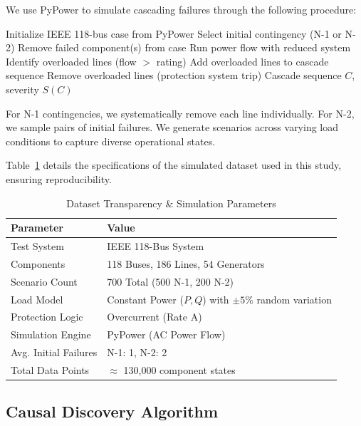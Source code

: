 \documentclass[journal,12pt,onecolumn]{IEEEtran}
\begin{document}
We use PyPower to simulate cascading failures through the following procedure:

\begin{algorithm}
\caption{Cascading Failure Simulation}
\begin{algorithmic}[1]
\STATE Initialize IEEE 118-bus case from PyPower
\STATE Select initial contingency (N-1 or N-2)
\STATE Remove failed component(s) from case
    \STATE Run power flow with reduced system
    \STATE Identify overloaded lines (flow $>$ rating)
    \STATE Add overloaded lines to cascade sequence
    \STATE Remove overloaded lines (protection system trip)
\ENDWHILE
\RETURN Cascade sequence $C$, severity $S(C)$
\end{algorithmic}
\end{algorithm}

For N-1 contingencies, we systematically remove each line individually. For N-2, we sample pairs of initial failures. We generate scenarios across varying load conditions to capture diverse operational states.

Table~\ref{tab:dataset} details the specifications of the simulated dataset used in this study, ensuring reproducibility.

\begin{table}[htbp]
\caption{Dataset Transparency \& Simulation Parameters}
\label{tab:dataset}
\centering
\begin{tabular}{ll}
\toprule
\textbf{Parameter} & \textbf{Value} \\
\midrule
Test System & IEEE 118-Bus System \\
Components & 118 Buses, 186 Lines, 54 Generators \\
Scenario Count & 700 Total (500 N-1, 200 N-2) \\
Load Model & Constant Power ($P, Q$) with $\pm5\%$ random variation \\
Protection Logic & Overcurrent (Rate A) \\
Simulation Engine & PyPower (AC Power Flow) \\
Avg. Initial Failures & N-1: 1, N-2: 2 \\
Total Data Points & $\approx$ 130,000 component states \\
\bottomrule
\end{tabular}
\end{table}

\subsection{Causal Discovery Algorithm}
\end{document}
